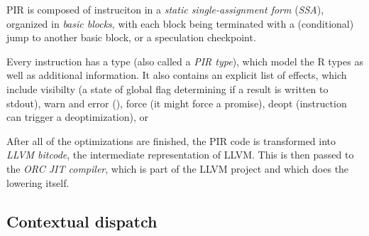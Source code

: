 PIR is composed of instruciton in a \textit{static single-assignment form} (\textit{SSA}), organized in \textit{basic blocks}, with each block being terminated with a (conditional) jump to another basic block, or a speculation checkpoint.

Every instruction has a type (also called a \textit{PIR type}), which model the R types as well as additional information. It also contains an explicit list of effects, which include visibilty (a state of global flag determining if a result is written to stdout), warn and error (\todo{\dots}), force (it might force a promise), deopt (instruction can trigger a deoptimization), or


After all of the optimizations are finished, the PIR code is transformed into \textit{LLVM bitcode}, the intermediate representation of LLVM. This is then passed to the \textit{ORC JIT compiler}, which is part of the LLVM project and which does the lowering itself.

\subsection{Contextual dispatch}

